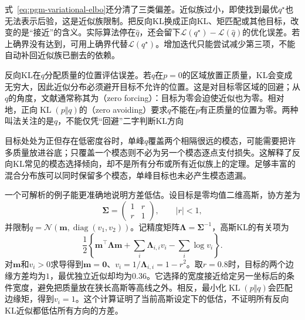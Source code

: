 式~\eqref{eq:pgm-variational-elbo}还分清了三类偏差。近似族过小，即使找到最优$q^\star$也无法表示后验，这是近似族限制。把反向KL换成正向KL、矩匹配或其他目标，改变的是“接近”的含义。实际算法停在$\widehat q$，还会留下$\mathcal L(q^\star)-\mathcal L(\widehat q)$的优化误差。若上确界没有达到，可用上确界代替$\mathcal L(q^\star)$。增加迭代只能尝试减少第三项，不能自动补回近似族已删去的依赖。

反向KL在$q$分配质量的位置评估误差。若$q$在$p=0$的区域放置正质量，KL会变成无穷大，因此近似分布必须避开目标不允许的位置。这是对目标零区域的回避；从$q$的角度，文献通常称其为（zero forcing）：目标为零会迫使近似也为零。相对地，正向$\operatorname{KL}(p\Vert q)$的（zero avoiding）要求$q$不能在$p$有正质量的位置为零。两种叫法关注的是$q$，不能仅凭“回避”二字判断KL方向

目标处处为正但存在低密度谷时，单峰$q$覆盖两个相隔很远的模态，可能需要把许多质量放进谷底；只覆盖一个模态则不必为另一个模态逐点支付损失。这解释了反向KL常见的模态选择倾向，却不是所有分布或所有近似族上的定理。足够丰富的混合分布族可以同时保留多个模态，单峰目标也未必产生模态遗漏。

一个可解析的例子能更准确地说明方差低估。设目标是零均值二维高斯，协方差为
\[
  \bm{\Sigma}=
  \begin{pmatrix}1&r\\r&1\end{pmatrix},
  \qquad |r|<1,
\]
并限制$q=\mathcal N(\bm{m},\operatorname{diag}(v_1,v_2))$。记精度矩阵$\bm{\Lambda}=\bm{\Sigma}^{-1}$，高斯KL的有关项为
\[
  \frac12\left\{\bm{m}^{\top}\bm{\Lambda}\bm{m}
     +\sum_i\bm{\Lambda}_{i,i}v_i-\sum_i\log v_i\right\}.
\]
对$\bm{m}$和$v_i>0$求导得到$\bm{m}=\bm{0}$、$v_i=1/\bm{\Lambda}_{i,i}=1-r^2$。取$r=0.8$时，目标的两个边缘方差均为$1$，最优独立近似却均为$0.36$。它选择的宽度接近给定另一坐标后的条件宽度，避免把质量放在狭长高斯等高线之外。相反，最小化$\operatorname{KL}(p\Vert q)$会匹配边缘矩，得到$v_i=1$。这个计算证明了当前高斯设定下的低估，不证明所有反向KL近似都低估所有方向的方差。

